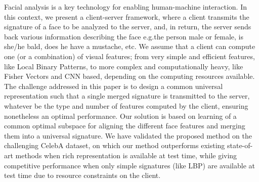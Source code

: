 \documentclass{sig-alternate-05-2015}
\begin{document}
Facial analysis is a key technology for enabling human-machine interaction. In this context, we present a client-server framework, where a client transmits the signature of a face to be analyzed to the server, and, in return, the server sends back various information describing the face e.g.\is the person male or female, is she/he bald, does he have a mustache, etc. We assume that a client can compute one (or a combination) of visual features; from very simple and efficient features, like Local Binary Patterns, to more complex and  computationally heavy, like Fisher Vectors and CNN based, depending on the computing resources available. The challenge addressed in this paper is to design a common universal representation such that a single merged signature is transmitted to the server, whatever be the type and number of features computed by the client, ensuring nonetheless an optimal performance. Our solution is based on learning of a common optimal subspace for aligning the different face features and merging them into a universal signature. We have validated the proposed method on the challenging CelebA dataset, on which our method outperforms existing state-of-art methods when rich representation is available at test time, while giving  competitive performance when only simple signatures (like LBP) are available at test time due to resource constraints on the client.  
\end{document}
